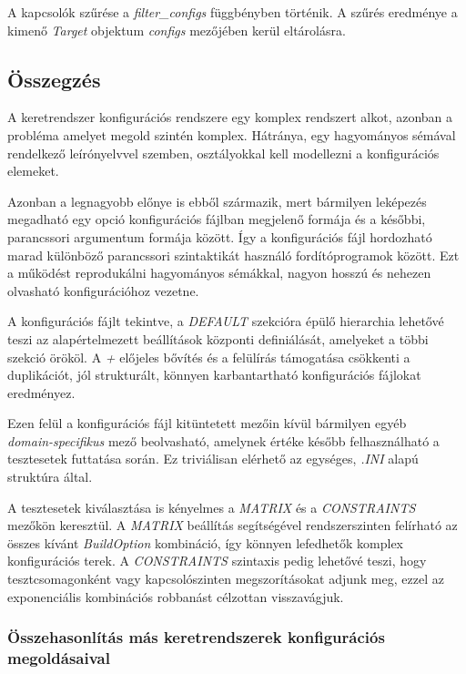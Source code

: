             A kapcsolók szűrése a \textit{filter\_configs} függbényben történik. A szűrés eredménye a kimenő
            \textit{Target} objektum \textit{configs} mezőjében kerül eltárolásra.

    \subsection{Összegzés}

        A keretrendszer konfigurációs rendszere egy komplex rendszert alkot, azonban a probléma amelyet megold szintén
        komplex. Hátránya, egy hagyományos sémával rendelkező leírónyelvvel szemben, osztályokkal kell modellezni a
        konfigurációs elemeket.

        Azonban a legnagyobb előnye is ebből származik, mert bármilyen leképezés megadható egy opció konfigurációs
        fájlban megjelenő formája és a későbbi, parancssori argumentum formája között. Így a konfigurációs fájl
        hordozható marad különböző parancssori szintaktikát használó fordítóprogramok között. Ezt a működést
        reprodukálni hagyományos sémákkal, nagyon hosszú és nehezen olvasható konfigurációhoz vezetne.

        A konfigurációs fájlt tekintve, a \textit{DEFAULT} szekcióra épülő hierarchia lehetővé teszi az alapértelmezett
        beállítások központi definiálását, amelyeket a többi szekció örököl. A \textit{+} előjeles bővítés és a
        felülírás támogatása csökkenti a duplikációt, jól strukturált, könnyen karbantartható konfigurációs fájlokat
        eredményez.

        Ezen felül a konfigurációs fájl kitüntetett mezőin kívül bármilyen egyéb \\ \textit{domain-specifikus} mező
        beolvasható, amelynek értéke később felhasználható a tesztesetek futtatása során. Ez triviálisan elérhető az
        egységes, \textit{.INI} alapú struktúra által.

        A tesztesetek kiválasztása is kényelmes a \textit{MATRIX} és a \textit{CONSTRAINTS} mezőkön keresztül. A
        \textit{MATRIX} beállítás segítségével rendszerszinten felírható az összes kívánt \textit{BuildOption}
        kombináció, így könnyen lefedhetők komplex konfigurációs terek. A \textit{CONSTRAINTS} szintaxis pedig lehetővé
        teszi, hogy tesztcsomagonként vagy kapcsolószinten megszorításokat adjunk meg, ezzel az exponenciális
        kombinációs robbanást célzottan visszavágjuk.

        \subsubsection{Összehasonlítás más keretrendszerek konfigurációs megoldásaival}

